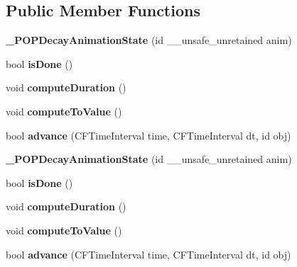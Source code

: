 \subsection*{Public Member Functions}
\begin{DoxyCompactItemize}
\item 
\mbox{\label{struct___p_o_p_decay_animation_state_a4b8a01c5bbbcf3d10386824000e62054}} 
{\bfseries \+\_\+\+P\+O\+P\+Decay\+Animation\+State} (id \+\_\+\+\_\+unsafe\+\_\+unretained anim)
\item 
\mbox{\label{struct___p_o_p_decay_animation_state_a6284ac6503b3c19a970a9982487e060d}} 
bool {\bfseries is\+Done} ()
\item 
\mbox{\label{struct___p_o_p_decay_animation_state_a3556970de85d97718f6816d2a4c7f2ab}} 
void {\bfseries compute\+Duration} ()
\item 
\mbox{\label{struct___p_o_p_decay_animation_state_a93062a0697ff5fcebe5a386dcbc00c43}} 
void {\bfseries compute\+To\+Value} ()
\item 
\mbox{\label{struct___p_o_p_decay_animation_state_a97fbcd897d145018311e339e7bb0a52c}} 
bool {\bfseries advance} (C\+F\+Time\+Interval time, C\+F\+Time\+Interval dt, id obj)
\item 
\mbox{\label{struct___p_o_p_decay_animation_state_a4b8a01c5bbbcf3d10386824000e62054}} 
{\bfseries \+\_\+\+P\+O\+P\+Decay\+Animation\+State} (id \+\_\+\+\_\+unsafe\+\_\+unretained anim)
\item 
\mbox{\label{struct___p_o_p_decay_animation_state_a6284ac6503b3c19a970a9982487e060d}} 
bool {\bfseries is\+Done} ()
\item 
\mbox{\label{struct___p_o_p_decay_animation_state_a3556970de85d97718f6816d2a4c7f2ab}} 
void {\bfseries compute\+Duration} ()
\item 
\mbox{\label{struct___p_o_p_decay_animation_state_a93062a0697ff5fcebe5a386dcbc00c43}} 
void {\bfseries compute\+To\+Value} ()
\item 
\mbox{\label{struct___p_o_p_decay_animation_state_a97fbcd897d145018311e339e7bb0a52c}} 
bool {\bfseries advance} (C\+F\+Time\+Interval time, C\+F\+Time\+Interval dt, id obj)
\end{DoxyCompactItemize}
